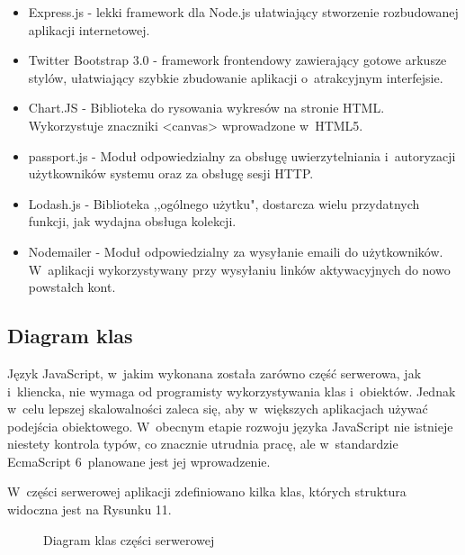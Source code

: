 \documentclass[12pt,a4paper,notitlepage]{article}
\begin{document}
\begin{itemize}
\item Express.js - lekki framework dla Node.js ułatwiający stworzenie rozbudowanej aplikacji internetowej.
\item Twitter Bootstrap 3.0 - framework frontendowy zawierający gotowe arkusze stylów, ułatwiający szybkie zbudowanie aplikacji o~atrakcyjnym interfejsie.
\item Chart.JS - Biblioteka do rysowania wykresów na stronie HTML. Wykorzystuje znaczniki <canvas> wprowadzone w~HTML5.
\item passport.js - Moduł odpowiedzialny za obsługę uwierzytelniania i~autoryzacji użytkowników systemu oraz za obsługę sesji HTTP.
\item Lodash.js - Biblioteka ,,ogólnego użytku", dostarcza wielu przydatnych funkcji, jak wydajna obsługa kolekcji.
\item Nodemailer - Moduł odpowiedzialny za wysyłanie emaili do użytkowników. W~aplikacji wykorzystywany przy wysyłaniu linków aktywacyjnych do nowo powstałch kont.
\end{itemize}

\subsection{Diagram klas}
Język JavaScript, w~jakim wykonana została zarówno część serwerowa, jak i~kliencka, nie wymaga od programisty wykorzystywania klas i~obiektów. Jednak w~celu lepszej skalowalności zaleca się, aby w~większych aplikacjach używać podejścia obiektowego. W~obecnym etapie rozwoju języka JavaScript nie istnieje niestety kontrola typów, co znacznie utrudnia pracę, ale w~standardzie EcmaScript 6~planowane jest jej wprowadzenie.
\par W~części serwerowej aplikacji zdefiniowano kilka klas, których struktura widoczna jest na Rysunku 11.

\begin{figure}[H]
\begin{center}
\caption{Diagram klas części serwerowej}
\end{center}
\end{figure}
\end{document}
